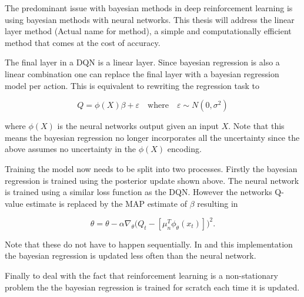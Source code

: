 The predominant issue with bayesian methods in deep reinforcement learning is using bayesian methods with neural networks. This thesis will address the linear layer method (\todo Actual name for method), a simple and computationally efficient method that comes at the cost of accuracy. 

The final layer in a DQN is a linear layer. Since bayesian regression is also a linear combination one can replace the final layer with a bayesian regression model per action. This is equivalent to rewriting the regression task to 

\begin{equation*}
	Q = \phi(X)\beta + \varepsilon \quad \text{where} \quad \varepsilon \sim N(0,\sigma^2)
\end{equation*}

where $\phi(X)$ is the neural networks output given an input $X$. Note that this means the bayesian regression no longer incorporates all the uncertainty since the above assumes no uncertainty in the $\phi(X)$ encoding. 

Training the model now needs to be split into two processes. Firstly the bayesian regression is trained using the posterior update shown above. The neural network is trained using a similar loss function as the DQN. However the networks Q-value estimate is replaced by the MAP estimate of $\beta$ resulting in

\begin{equation*}
	\theta = \theta - \alpha\nabla_\theta\big(Q_t - [\mu_n^T\phi_\theta(x_t)]\big)^2.
\end{equation*}

Note that these do not have to happen sequentially. In \cite{azziz_2018} and this implementation the bayesian regression is updated less often than the neural network.

Finally to deal with the fact that reinforcement learning is a non-stationary problem the the bayesian regression is trained for scratch each time it is updated.

\cleardoublepage
